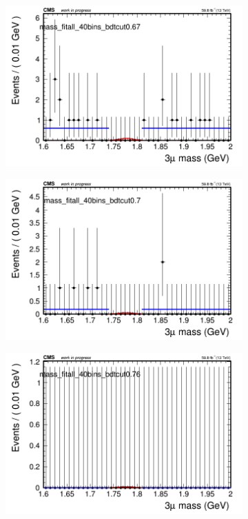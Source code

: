 \begin{figure}[H]
\begin{subfigure}{0.2\textwidth}
        \caption{}
    \end{subfigure}
    \begin{subfigure}{0.2\textwidth}
        \includegraphics[width=\textwidth]{flat_fit/plots/all/massfit_all_40bins_bdtcut0.67.png}
        \caption{}
    \end{subfigure}
    \begin{subfigure}{0.2\textwidth}
        \includegraphics[width=\textwidth]{flat_fit/plots/all/massfit_all_40bins_bdtcut0.7.png}
        \caption{}
    \end{subfigure}
    \begin{subfigure}{0.2\textwidth}
        \includegraphics[width=\textwidth]{flat_fit/plots/all/massfit_all_40bins_bdtcut0.76.png}

\end{subfigure}
\end{figure}
